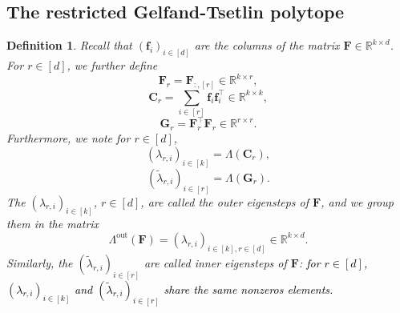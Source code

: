 \documentclass[twoside,11pt]{book}
\newcommand{\rev}[1]{\textcolor{black}{#1}}
\newtheorem{definition}{Definition}
\numberwithin{theorem}{chapter}
\numberwithin{definition}{chapter}
\numberwithin{proposition}{chapter}
\numberwithin{corollary}{chapter}
\numberwithin{example}{chapter}
\numberwithin{lemma}{chapter}
\numberwithin{assumption}{chapter}
\numberwithin{equation}{chapter}
\numberwithin{figure}{chapter}
\DeclareMathOperator{\Tran}{\intercal}
\begin{document}
\begin{subappendices}
\subsection{The restricted Gelfand-Tsetlin polytope}
\label{s:gt}
\begin{definition}
Recall that $(\bm{f}_{i})_{i \in [d]}$ are the columns of the matrix $\bm{F}\in\mathbb{R}^{k\times d}$. For $r \in [d]$, we further define
\begin{equation}
\bm{F}_{r} = \bm{F}_{:,[r]} \in \mathbb{R}^{k \times r},
\end{equation}
\begin{equation}
\bm{C}_{r} = \sum\limits_{i \in [r]} \bm{f}_{i}\bm{f}_{i}^{\Tran} \in \mathbb{R}^{k \times k},
\end{equation}
\begin{equation}
\bm{G}_{r} = \bm{F}_{r}^{\Tran}\bm{F}_{r} \in \mathbb{R}^{r \times r}.
\end{equation}
Furthermore, we note for $r \in [d]$,
\begin{equation}
    (\lambda_{r,i})_{i \in [k]} = \Lambda(\bm{C}_{r}),
\end{equation}
\begin{equation}
    (\tilde{\lambda}_{r,i})_{i \in [r]} = \Lambda(\bm{G}_{r}).
\end{equation}
The $(\lambda_{r,i})_{i \in [k]}$, $r\in [d]$, are called the outer eigensteps of $\bm{F}$, and we group them in the matrix $$\Lambda^{\text{out}}(\bm{F}) = (\lambda_{r,i})_{i \in [k],r \in [d]} \in \mathbb{R}^{k \times d}.$$ Similarly, the $(\tilde{\lambda}_{r,i})_{i \in [r]}$ are called inner eigensteps of $\bm{F}$: \rev{for $r \in [d]$, $(\lambda_{r,i})_{i \in [k]}$ and $(\tilde{\lambda}_{r,i})_{i \in [r]}$ share the same nonzeros elements.}
\end{definition}



\end{subappendices}
\end{document}

